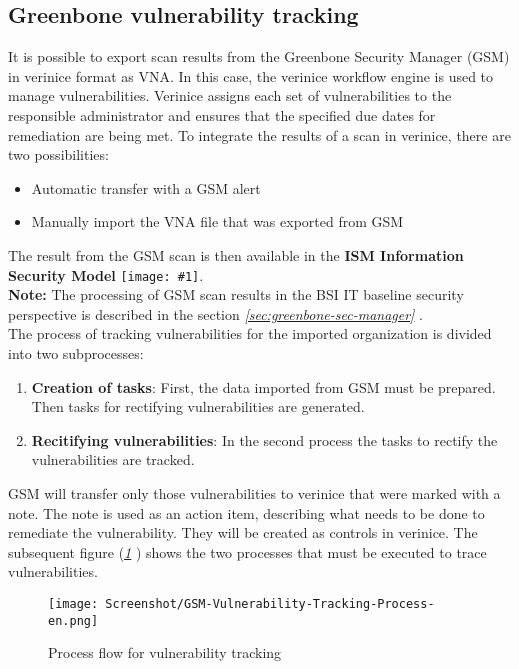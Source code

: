 \documentclass[a4paper,10pt]{book}
\newcommand{\icon}[1]{\texttt{[image: \#1]}}
\begin{document}
\subsection{Greenbone vulnerability tracking} \label{Greenbone vulnerability tracking}
It is possible to export scan results from the Greenbone Security Manager (GSM) in verinice format as VNA.
In this case, the verinice workflow engine is used to manage vulnerabilities. Verinice assigns each set of vulnerabilities to the responsible administrator and ensures that the specified due dates for remediation are being met.
To integrate the results of a scan in verinice, there are two possibilities:
 \begin{itemize}
 \item Automatic transfer with a GSM alert
 \item Manually import the VNA file that was exported from GSM
\end{itemize}
The result from the GSM scan is then available in the \textbf{ISM Information Security Model} \icon{Icon/Informationssicherheitsmodell.png}.
\newline\\
\textbf{Note:} The processing of GSM scan results in the BSI IT baseline security perspective is described in the section {\em \ref{sec:greenbone-sec-manager} }.
\newline\\
The process of tracking vulnerabilities for the imported organization is divided into two subprocesses:
\begin{enumerate}
 \item \textbf{Creation of tasks}: First, the data imported from GSM must be prepared. Then tasks for rectifying vulnerabilities are generated.
 \item \textbf{Recitifying vulnerabilities}: In the second process the tasks to rectify the vulnerabilities are tracked.
\end{enumerate}
GSM will transfer only those vulnerabilities to verinice that were marked with a note. The note is used as an action item, describing what needs to be done to remediate the vulnerability. They will be created as controls in verinice.
The subsequent figure ({\em \ref{Process flow for vulnerability tracking} }) shows the two processes that must be executed to trace vulnerabilities.
\begin{figure}[htb!]
  \centering
  \texttt{[image: Screenshot/GSM-Vulnerability-Tracking-Process-en.png]}
  \caption{\label{Process flow for vulnerability tracking} Process flow for vulnerability tracking}
\end{figure}
\newline
\end{document}
